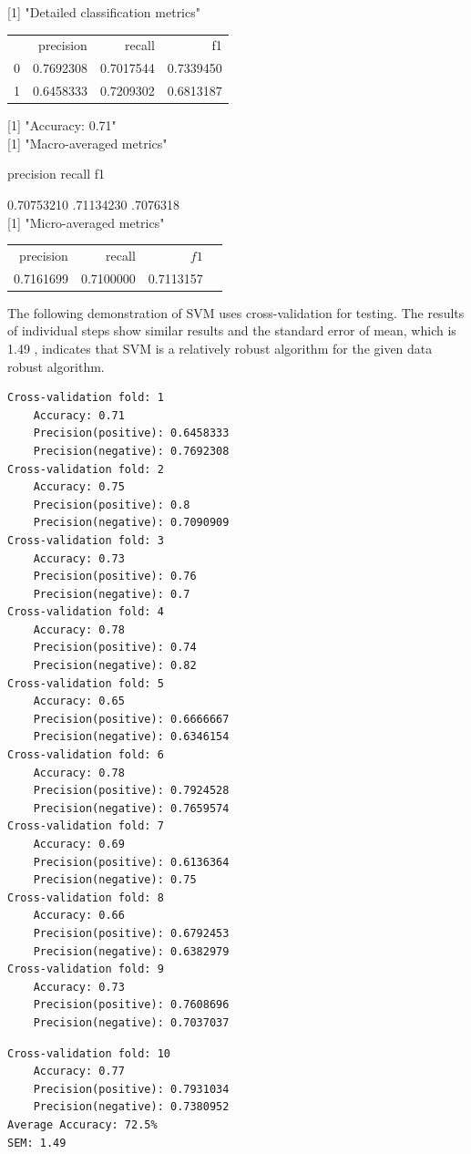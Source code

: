 [1] "Detailed classification metrics"

\begin{center}
\begin{tabular}{rrrr}
 & precision & recall & f1 \\
0 & 0.7692308 & 0.7017544 & 0.7339450 \\
1 & 0.6458333 & 0.7209302 & 0.6813187 \\
\end{tabular}
\end{center}

[1] "Accuracy: 0.71"\\[0pt]
[1] "Macro-averaged metrics"

precision recall f1

0.70753210 .71134230 .7076318\\[0pt]
[1] "Micro-averaged metrics"

\begin{center}
\begin{tabular}{rrrr}
precision & recall & $f 1$ \\
0.7161699 & 0.7100000 & 0.7113157 \\
\end{tabular}
\end{center}

The following demonstration of SVM uses cross-validation for testing. The results of individual steps show similar results and the standard error of mean, which is 1.49 , indicates that SVM is a relatively robust algorithm for the given data robust algorithm.

\begin{verbatim}
Cross-validation fold: 1
    Accuracy: 0.71
    Precision(positive): 0.6458333
    Precision(negative): 0.7692308
Cross-validation fold: 2
    Accuracy: 0.75
    Precision(positive): 0.8
    Precision(negative): 0.7090909
Cross-validation fold: 3
    Accuracy: 0.73
    Precision(positive): 0.76
    Precision(negative): 0.7
Cross-validation fold: 4
    Accuracy: 0.78
    Precision(positive): 0.74
    Precision(negative): 0.82
Cross-validation fold: 5
    Accuracy: 0.65
    Precision(positive): 0.6666667
    Precision(negative): 0.6346154
Cross-validation fold: 6
    Accuracy: 0.78
    Precision(positive): 0.7924528
    Precision(negative): 0.7659574
Cross-validation fold: 7
    Accuracy: 0.69
    Precision(positive): 0.6136364
    Precision(negative): 0.75
Cross-validation fold: 8
    Accuracy: 0.66
    Precision(positive): 0.6792453
    Precision(negative): 0.6382979
Cross-validation fold: 9
    Accuracy: 0.73
    Precision(positive): 0.7608696
    Precision(negative): 0.7037037
\end{verbatim}

\begin{verbatim}
Cross-validation fold: 10
    Accuracy: 0.77
    Precision(positive): 0.7931034
    Precision(negative): 0.7380952
Average Accuracy: 72.5%
SEM: 1.49
\end{verbatim}

% 